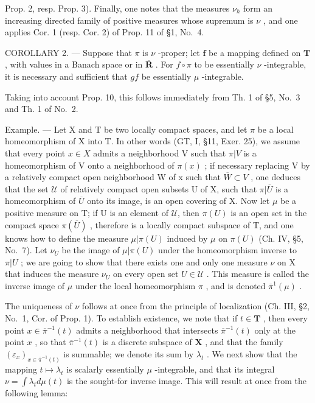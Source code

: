 Prop. 2, resp. Prop. 3). Finally, one notes that the measures \(\nu_{h}\) form an increasing directed family of positive measures whose supremum is \(\nu\) , and one applies Cor. 1 (resp. Cor. 2) of Prop. 11 of §1, No.~4.

COROLLARY 2. --- Suppose that \(\pi\) is \(\nu\) -proper; let \(\mathbf{f}\) be a mapping defined on \(\mathbf{T}\) , with values in a Banach space or in \(\overline{\mathbf{R}}\) . For \(f \circ \pi\) to be essentially \(\nu\) -integrable, it is necessary and sufficient that \(gf\) be essentially \(\mu\) -integrable.

Taking into account Prop. 10, this follows immediately from Th. 1 of §5, No.~3 and Th. 1 of No.~2.

Example. --- Let X and T be two locally compact spaces, and let \(\pi\) be a local homeomorphism of X into T. In other words (GT, I, §11, Exer. 25), we assume that every point \(x \in X\) admits a neighborhood V such that \(\pi|V\) is a homeomorphism of V onto a neighborhood of \(\pi(x)\) ; if necessary replacing V by a relatively compact open neighborhood W of x such that \(\overline{W} \subset V\) , one deduces that the set \(\mathcal{U}\) of relatively compact open subsets U of X, such that \(\pi|\overline{U}\) is a homeomorphism of \(\overline{U}\) onto its image, is an open covering of X. Now let \(\mu\) be a positive measure on T; if U is an element of \(\mathcal{U}\), then \(\pi(U)\) is an open set in the compact space \(\pi(\overline{U})\) , therefore is a locally compact subspace of T, and one knows how to define the measure \(\mu|\pi(U)\) induced by \(\mu\) on \(\pi(U)\) (Ch. IV, §5, No.~7). Let \(\nu_{U}\) be the image of \(\mu|\pi(U)\) under the homeomorphism inverse to \(\pi|U\) ; we are going to show that there exists one and only one measure \(\nu\) on X that induces the measure \(\nu_{U}\) on every open set \(U \in \mathcal{U}\) . This measure is called the inverse image of \(\mu\) under the local homeomorphism \(\pi\) , and is denoted \(\overline{\pi}^{1}(\mu)\) .

The uniqueness of \(\nu\) follows at once from the principle of localization (Ch. III, §2, No.~1, Cor. of Prop. 1). To establish existence, we note that if \(t \in \mathbf{T}\) , then every point \(x \in \overline{\pi}^{-1}(t)\) admits a neighborhood that intersects \(\overline{\pi}^{-1}(t)\) only at the point \(x\) , so that \(\overline{\pi}^{-1}(t)\) is a discrete subspace of \(\mathbf{X}\) , and that the family \((\varepsilon_x)_{x \in \overline{\pi}^{-1}(t)}\) is summable; we denote its sum by \(\lambda_t\) . We next show that the mapping \(t \mapsto \lambda_t\) is scalarly essentially \(\mu\) -integrable, and that its integral \(\nu = \int \lambda_t d\mu(t)\) is the sought-for inverse image. This will result at once from the following lemma:

